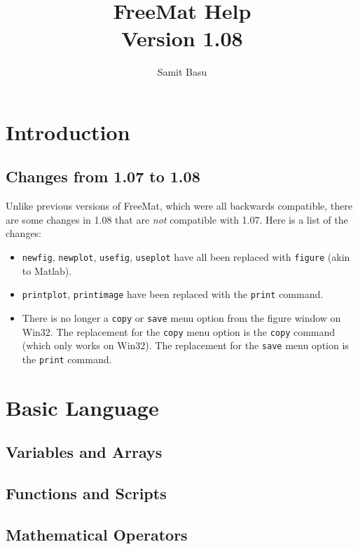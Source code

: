 \documentclass{book}
\title{FreeMat Help\\Version 1.08}
\author{Samit Basu}
\begin{document}
\maketitle
\tableofcontents
\chapter{Introduction}
\section{Changes from 1.07 to 1.08}
Unlike previous versions of FreeMat, which were all backwards compatible, there are some changes in 1.08 that are \emph{not} compatible with 1.07.  Here is a list of the changes:
\begin{itemize}
\item \verb|newfig|, \verb|newplot|, \verb|usefig|, \verb|useplot| have all been replaced with \verb|figure| (akin to Matlab).
\item \verb|printplot|, \verb|printimage| have been replaced with the \verb|print| command.
\item There is no longer a \verb|copy| or \verb|save| menu option from the figure window on Win32.  The replacement for the \verb|copy| menu option is the \verb|copy| command (which only works on Win32).  The replacement for the \verb|save| menu option  is the \verb|print| command.
\end{itemize}
\chapter{Basic Language}
\section{Variables and Arrays}






\section{Functions and Scripts}








\section{Mathematical Operators}















\end{document}
